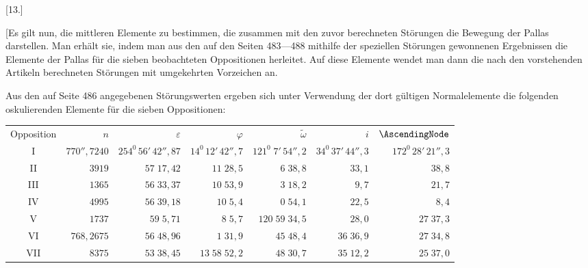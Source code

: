 \clearpage
\begin{landscape}
\begingroup
\fontsize{10}{13}\selectfont
{}
\renewcommand{\headrulewidth}{0pt}
\begin{center}[13.]\end{center}
\par\noindent\hspace*{\parindent}[Es gilt nun, die mittleren Elemente zu bestimmen, die zusammen mit den zuvor berechneten Störungen die Bewegung der Pallas darstellen. Man erhält sie, indem man aus den auf den Seiten 483---488 mithilfe der speziellen Störungen gewonnenen Ergebnissen die Elemente der Pallas für die sieben beobachteten Oppositionen herleitet. Auf diese Elemente wendet man dann die nach den vorstehenden Artikeln berechneten Störungen mit umgekehrten Vorzeichen an.
\par\noindent\hspace*{\parindent}Aus den auf Seite 486 angegebenen Störungswerten ergeben sich unter Verwendung der dort gültigen Normalelemente die folgenden oskulierenden Elemente für die sieben Oppositionen:
\begingroup
\small\setlength{\tabcolsep}{5pt}\renewcommand{\arraystretch}{1.18}
\begin{center}
\begin{tabular}{c|r|r|r|r|r|r}
Opposition&\(n\)&\(\varepsilon\)&\(\varphi\)&\(\tilde\omega\)&\(i\)&\(\AscendingNode\)\\
I&\(770''{,}7240\)&\(254^0\,56'\,42''{,}87\)&\(14^0\,12'\,42''{,}7\)&\(121^0\;7'\,54''{,}2\)&\(34^0\,37'\,44''{,}3\)&\(172^0\,28'\,21''{,}3\)\\
II&\(3919\)&\(57\;17{,}42\)&\(11\;28{,}5\)&\(6\;38{,}8\)&\(33{,}1\)&\(38{,}8\)\\
III&\(1365\)&\(56\;33{,}37\)&\(10\;53{,}9\)&\(3\;18{,}2\)&\(9{,}7\)&\(21{,}7\)\\
IV&\(4995\)&\(56\;39{,}18\)&\(10\;5{,}4\)&\(0\;54{,}1\)&\(22{,}5\)&\(8{,}4\)\\
V&\(1737\)&\(59\;5{,}71\)&\(8\;5{,}7\)&\(120\;59\;34{,}5\)&\(28{,}0\)&\(27\;37{,}3\)\\
VI&\(768{,}2675\)&\(56\;48{,}96\)&\(1\;31{,}9\)&\(45\;48{,}4\)&\(36\;36{,}9\)&\(27\;34{,}8\)\\
VII&\(8375\)&\(53\;38{,}45\)&\(13\;58\;52{,}2\)&\(48\;30{,}7\)&\(35\;12{,}2\)&\(25\;37{,}0\)
\end{tabular}
\end{center}

\end{landscape}
